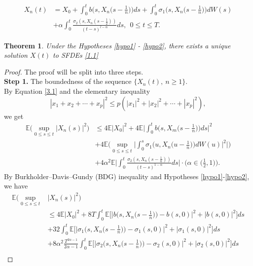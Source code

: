 \documentclass[a4 paper, 12pt]{report}
\theoremstyle{plain}
\newtheorem{theorem}{\textbf{Theorem}}[section]
\begin{document}
\begin{equation}\label{3.1}
\begin{split}
X_n(t) &= X_0+\int_0^t b\bigg(s,X_n\bigg(s-\frac{1}{n}\bigg)\bigg)ds+ \int_0^t\sigma_1\bigg(s,X_n\bigg(s-\frac{1}{n}\bigg)\bigg)dW(s)\\
&+\alpha\int_0^t\frac{\sigma_2(s,X_n(s-\frac{1}{2}))}{(t-s)^{l-\alpha}}ds,~~0\leq t\leq T.
\end{split}
\end{equation}
\begin{theorem}\label{3.1}
Under the  Hypotheses \ref{hypo1} - \ref{hypo2}, there exists a unique solution $X(t)$ to SFDEs \eqref{1.1}
\end{theorem}
\begin{proof}
The proof will be split into three steps.\\
\textbf{Step 1.} The boundedness of the sequence $\{X_n(t),~n\geq 1\}$.\\
By Equation \eqref{3.1} and the elementary inequality
\begin{equation}\label{3.2}
|x_1+x_2+\cdots+x_p|^2\leq p(|x_1|^2+|x_2|^2+\cdots+|x_p|^2),
\end{equation}
we get
\begin{align*}
\mathbb{E}\bigg(\sup_{0\leq s\leq t}|X_n(s)|^2\bigg)&\leq 4\mathbb{E}|X_0|^2+4\mathbb{E}\bigg|\int_0^tb\bigg(s,X_m\bigg(s-\frac{1}{n}\bigg)\bigg)ds\bigg|^2\\
&+4\mathbb{E}\bigg(\sup_{0\leq s\leq t}\bigg|\int_0^s\sigma_1\bigg( u,X_n\bigg(u-\frac{1}{n}\bigg)\bigg)dW(u)|^2\bigg|\bigg)\\
&+4\alpha^2\mathbb{E}\bigg|\int_0^t\frac{\sigma_2(s,X_n(s-\frac{1}{n}))}{(t-s)^{1-\alpha}}ds\bigg|\cdot\bigg(\alpha\in\bigg(\frac{1}{2},1\bigg)\bigg).
\end{align*}
By Burkholder–Davis–Gundy (BDG) inequality and Hypotheses \ref{hypo1}-\ref{hypo2}, we have
\begin{align*}
\mathbb{E}\bigg(\sup_{0\leq s\leq t}&|X_n(s)|^2\bigg)\\
&\leq 4\mathbb{E}|X_0|^2+8T\int_{0}^t\mathbb{E}\bigg[
\bigg|b\bigg(s,X_n\bigg(s-\frac{1}{n}\bigg)\bigg) - b(s,0)\bigg|^2+|b(s,0)|^2\bigg]ds\\
&+32\int_{0}^t\mathbb{E}\bigg[\bigg|\sigma_1\bigg(s,X_n\bigg(s-\frac{1}{n}\bigg)\bigg) - \sigma_1(s,0)\bigg|^2+|\sigma_1(s,0)|^2\bigg]ds\\
&+8\alpha^2\frac{T^{2\alpha-1}}{2\alpha-1}\int_0^t\mathbb{E}\bigg[\bigg|\sigma_2\bigg(s,X_n\bigg(s-\frac{1}{n}\bigg)\bigg) - \sigma_2(s,0)\bigg|^2+|\sigma_2(s,0)|^2\bigg]ds\\

\end{align*}
\end{proof}
\end{document}
